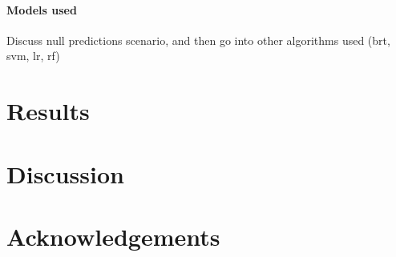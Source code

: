 \documentclass[12pt]{article}
\begin{document}
 \paragraph{Models used}
 Discuss null predictions scenario, and then go into other algorithms used (brt, svm, lr, rf)





 
 
  
\section{Results}

  
  
  


\section{Discussion}
 
 
 
 
 
 
 
\section{Acknowledgements}





\newpage
\end{document}
